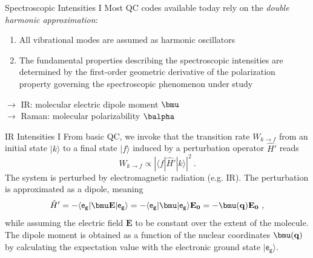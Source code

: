 \documentclass[t]{beamer}
\begin{document}
	\begin{frame}{Spectroscopic Intensities I}
	    Most QC codes available today rely on the \textit{double harmonic approximation}:
	    \begin{enumerate}
	        \item All vibrational modes are assumed as harmonic oscillators
	        \item The fundamental properties describing the spectroscopic intensities are determined by the first-order geometric derivative of the polarization property governing the spectroscopic phenomenon under study \\
	    \end{enumerate}
	    $\longrightarrow$ IR:  molecular electric dipole moment $\bmu$ \\
	    $\longrightarrow$ Raman:  molecular polarizability $\balpha$
	\end{frame}
	\begin{frame}{IR Intensities I}
	    From basic QC, we invoke that the transition rate $W_{k\rightarrow f}$ from an initial state $|k\rangle$ to a final state $|f\rangle$ induced by a perturbation operator $\hat{H}'$ reads 
	    \begin{equation*}
	        W_{k\rightarrow f}\propto \left| \langle f | \hat{H}' | k \rangle \right|^2~.
	    \end{equation*}
	    The system is perturbed by electromagnetic radiation (e.g. IR). The perturbation is approximated as a dipole, meaning 
	    \begin{equation*}
	        \hat{H}' = - \langle \mathsf{e_g} | \bmu\mathbf{E} | \mathsf{e_g} \rangle 
	        = - \langle \mathsf{e_g} | \bmu | \mathsf{e_g} \rangle \mathbf{E_0}
	        = - \bmu(\mathbf{q}) \mathbf{E_0}~,
	    \end{equation*}
	    while assuming the electric field $\mathbf{E}$ to be constant over the extent of the molecule. The dipole moment is obtained as a function of the nuclear coordinates $\bmu(\mathbf{q})$ by calculating the expectation value with the electronic ground state $| \mathsf{e_g} \rangle$. 
	\end{frame}
\end{document}
